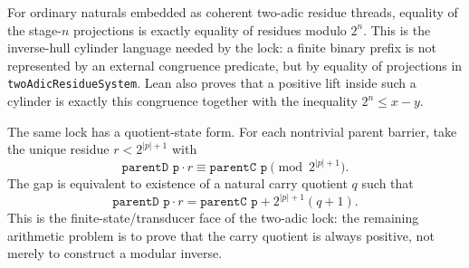 \begin{theorem}
  \label{thm:collatz-two-adic-stage-cylinder}
  \leanok
  For ordinary naturals embedded as coherent two-adic residue threads, equality
  of the stage-\(n\) projections is exactly equality of residues modulo \(2^n\).
  This is the inverse-hull cylinder language needed by the lock: a finite binary
  prefix is not represented by an external congruence predicate, but by equality
  of projections in \texttt{twoAdicResidueSystem}. Lean also proves that a
  positive lift inside such a cylinder is exactly this congruence together with
  the inequality \(2^n\le x-y\).
\end{theorem}
\begin{theorem}
  \label{thm:collatz-two-adic-carry-quotient-gap}
  \leanok
  The same lock has a quotient-state form. For each nontrivial parent barrier,
  take the unique residue \(r<2^{|p|+1}\) with
  \[
    \texttt{parentD p}\cdot r\equiv \texttt{parentC p}
      \pmod {2^{|p|+1}} .
  \]
  The gap is equivalent to existence of a natural carry quotient \(q\) such that
  \[
    \texttt{parentD p}\cdot r
      = \texttt{parentC p}+2^{|p|+1}(q+1).
  \]
  This is the finite-state/transducer face of the two-adic lock: the remaining
  arithmetic problem is to prove that the carry quotient is always positive, not
  merely to construct a modular inverse.
\end{theorem}
